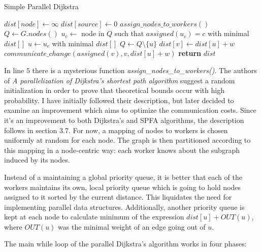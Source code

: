 \documentclass[12pt,a4paper,twoside,openright]{report}
\begin{document}
\begin{algorithm}
\caption{Simple Parallel Dijkstra}\label{pdijkstraagain}
\begin{algorithmic}[1]
    \State $dist[node] \gets \infty$
\EndFor
\State $dist[source] \gets 0$
\State $assign\_nodes\_to\_workers()$
\State $Q \gets G.nodes()$
        \State $u_c \gets$ node in $Q$ such that $assigned(u_c) = c$ with minimal $dist[]$
        \EndFor
        \State $u \gets u_c$ with minimal $dist[]$
        \State $Q \gets Q \setminus \{u\}$
            \State $dist[v] \gets dist[u] + w$
            \State $communicate\_change(assigned(v), v, dist[u] + w)$
        \EndIf
      \EndFor
    \EndWhile
\State \textbf{return} $dist$
\EndProcedure
\end{algorithmic}
\end{algorithm}

In line $5$ there is a mysterious function \textit{assign\_nodes\_to\_workers()}. The authors of \textit{A parallelization of Dijkstra's shortest path algorithm} \cite{dijkstra} suggest a random initialization in order to prove that theoretical bounds occur with high probability. I have initially followed their description, but later decided to examine an improvement which aims to optimize the communication costs. Since it's an improvement to both Dijkstra's and SPFA algorithms, the description follows in section 3.7. For now, a mapping of nodes to workers is chosen uniformly at random for each node. The graph is then partitioned according to this mapping in a node-centric way: each worker knows about the subgraph induced by its nodes.

Instead of a maintaining a global priority queue, it is better that each of the workers maintains its own, local priority queue which is going to hold nodes assigned to it sorted by the current distance. This liquidates the need for implementing parallel data structures. Additionally, another priority queue is kept at each node to calculate minimum of the expression $dist[u] + OUT(u)$, where $OUT(u)$ was the minimal weight of an edge going out of $u$. 

The main while loop of the parallel Dijkstra's algorithm works in four phases:
\end{document}
